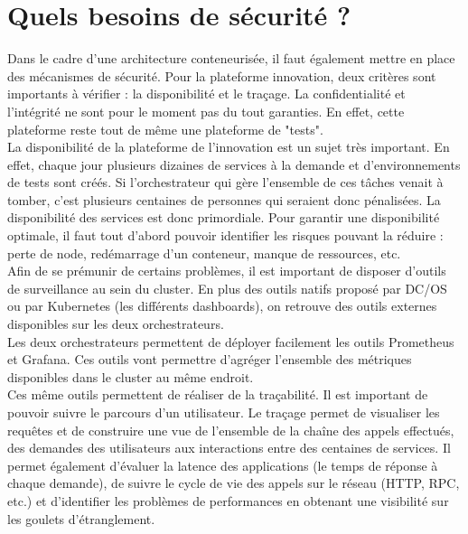 \documentclass[11pt,fleqn]{book} %
\begin{document}
\section{Quels besoins de sécurité ?}
Dans le cadre d'une architecture conteneurisée, il faut également mettre en place des mécanismes de sécurité. Pour la plateforme innovation, deux critères sont importants à vérifier : la disponibilité et le traçage. La confidentialité et l'intégrité ne sont pour le moment pas du tout garanties. En effet, cette plateforme reste tout de même une plateforme de "tests".\\

La disponibilité de la plateforme de l’innovation est un sujet très important. En effet, chaque jour plusieurs dizaines de services à la demande et d’environnements de tests sont créés. Si l’orchestrateur qui gère l’ensemble de ces tâches venait à tomber, c’est plusieurs centaines de personnes qui seraient donc pénalisées. La disponibilité des services est donc primordiale. Pour garantir une disponibilité optimale, il faut tout d’abord pouvoir identifier les risques pouvant la réduire : perte de node, redémarrage d’un conteneur, manque de ressources, etc. \\

Afin de se prémunir de certains problèmes, il est important de disposer d’outils de surveillance au sein du cluster. En plus des outils natifs proposé par DC/OS ou par Kubernetes (les différents dashboards), on retrouve des outils externes disponibles sur les deux orchestrateurs.\\

Les deux orchestrateurs permettent de déployer facilement les outils Prometheus et Grafana. Ces outils vont permettre d'agréger l'ensemble des métriques disponibles dans le cluster au même endroit. \\

Ces même outils permettent de réaliser de la traçabilité. Il est important de pouvoir suivre le parcours d'un utilisateur. Le traçage permet de visualiser les requêtes et de construire une vue de l’ensemble de la chaîne des appels effectués, des demandes des utilisateurs aux interactions entre des centaines de services. Il permet également d’évaluer la latence des applications (le temps de réponse à chaque demande), de suivre le cycle de vie des appels sur le réseau (HTTP, RPC, etc.) et d’identifier les problèmes de performances en obtenant une visibilité sur les goulets d’étranglement.\\
\end{document}
